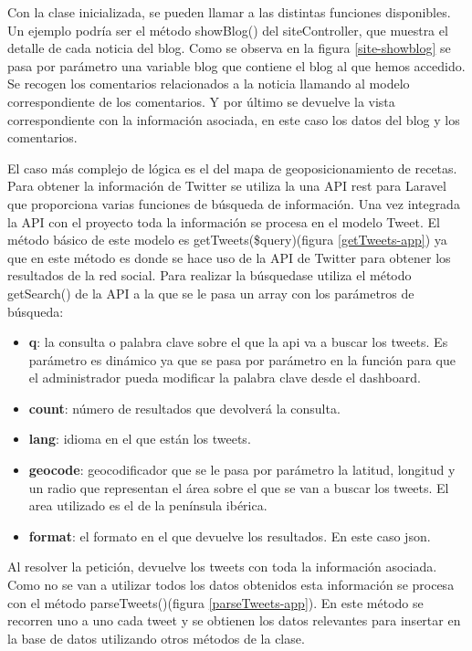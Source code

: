 Con la clase inicializada, se pueden llamar a las distintas funciones disponibles. Un ejemplo podría ser el método showBlog() del siteController,
 que muestra el detalle de cada noticia del blog. Como se observa en la figura \ref{site-showblog} se pasa por parámetro una variable blog que contiene
 el blog al que hemos accedido. Se recogen los comentarios relacionados a la noticia llamando al modelo correspondiente de los comentarios. Y por último
 se devuelve la vista correspondiente con la información asociada, en este caso los datos del blog y los comentarios.

 El caso más complejo de lógica es el del mapa de geoposicionamiento de recetas. Para obtener la información de Twitter se utiliza la una API rest
 para Laravel que proporciona varias funciones de búsqueda de información. Una vez integrada la API con el proyecto toda la información se procesa en el
 modelo Tweet. El método básico de este modelo es getTweets(\$query)(figura \ref{getTweets-app}) ya que en este método es donde se hace uso de la API
 de Twitter para obtener los resultados de la red social. Para realizar la búsquedase utiliza el método getSearch() de la API a la que se le pasa un
 array con los parámetros de búsqueda:


 \begin{itemize}

 \item \textbf{q}: la consulta o palabra clave sobre el que la api va a buscar los tweets. Es parámetro es dinámico ya que se pasa por parámetro en la función para que el administrador pueda modificar la palabra clave desde el dashboard.

 \item \textbf{count}: número de resultados que devolverá la consulta.

 \item \textbf{lang}: idioma en el que están los tweets.

 \item \textbf{geocode}: geocodificador que se le pasa por parámetro la latitud, longitud y un radio que representan el área sobre el que se van a buscar los tweets. El area utilizado es el de la península ibérica.

 \item \textbf{format}: el formato en el que devuelve los resultados. En este caso json.

 \end{itemize}


 Al resolver la petición, devuelve los tweets con toda la información asociada. Como no se van a utilizar todos los datos obtenidos esta información
 se procesa con el método parseTweets()(figura \ref{parseTweets-app}). En este método se recorren uno a uno cada tweet y se obtienen los datos relevantes
 para insertar en la base de datos utilizando otros métodos de la clase.
